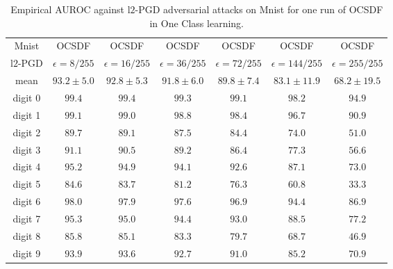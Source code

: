 \begin{table}%
    \centering
    \small
    \begin{tabular}{|c|cccccc|}
    \hline
      Mnist & OCSDF & OCSDF & OCSDF & OCSDF & OCSDF & OCSDF \\
      l$2$-PGD & $\epsilon=8/255$ & $\epsilon=16/255$ & $\epsilon=36/255$ & $\epsilon=72/255$ & $\epsilon=144/255$ & $\epsilon=255/255$\\
    \hline
    \hline
    mean & $93.2\pm 5.0$ & $92.8\pm 5.3$ & $91.8\pm 6.0$ & $89.8\pm 7.4$ & $83.1\pm 11.9$ & $68.2\pm 19.5$\\
    \hline
    digit 0 & $99.4$ & $99.4$ & $99.3$ & $99.1$ & $98.2$ & $94.9$\\
    digit 1 & $99.1$ & $99.0$ & $98.8$ & $98.4$ & $96.7$ & $90.9$\\
    digit 2 & $89.7$ & $89.1$ & $87.5$ & $84.4$ & $74.0$ & $51.0$\\
    digit 3 & $91.1$ & $90.5$ & $89.2$ & $86.4$ & $77.3$ & $56.6$\\
    digit 4 & $95.2$ & $94.9$ & $94.1$ & $92.6$ & $87.1$ & $73.0$\\
    digit 5 & $84.6$ & $83.7$ & $81.2$ & $76.3$ & $60.8$ & $33.3$\\
    digit 6 & $98.0$ & $97.9$ & $97.6$ & $96.9$ & $94.4$ & $86.9$\\
    digit 7 & $95.3$ & $95.0$ & $94.4$ & $93.0$ & $88.5$ & $77.2$\\
    digit 8 & $85.8$ & $85.1$ & $83.3$ & $79.7$ & $68.7$ & $46.9$\\
    digit 9 & $93.9$ & $93.6$ & $92.7$ & $91.0$ & $85.2$ & $70.9$\\
    \hline
    \end{tabular}
    \caption{Empirical AUROC against l$2$-PGD adversarial attacks on Mnist for one run of OCSDF in One Class learning.}
    \label{tab:empiricalOCSDFmnist}
\end{table}

